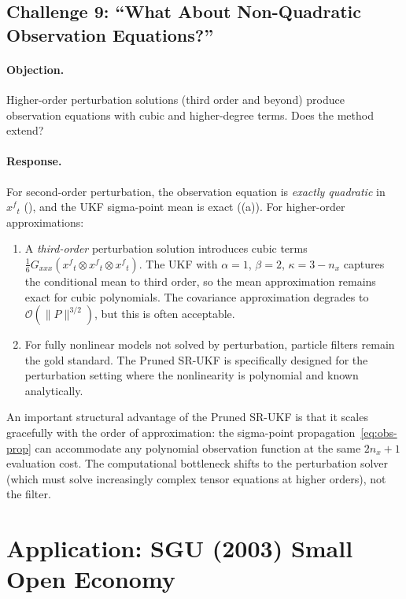 \documentclass[12pt,a4paper]{article}
\newcommand{\kron}{\otimes}
\newcommand{\xf}{{x^{f}}}
\newcommand{\cO}{\mathcal{O}}
\begin{document}
\subsection{Challenge 9: ``What About Non-Quadratic Observation Equations?''}
\label{sec:challenge-nonquad}

\paragraph{Objection.}
Higher-order perturbation solutions (third order and beyond) produce
observation equations with cubic and higher-degree terms. Does the
method extend?

\paragraph{Response.}
For second-order perturbation, the observation equation is
\emph{exactly quadratic} in~$\xf_t$ (), and the
UKF sigma-point mean is exact ((a)). For
higher-order approximations:
\begin{enumerate}[nosep]
\item A \emph{third-order} perturbation solution introduces cubic
terms $\tfrac{1}{6}G_{xxx}(\xf_t \kron \xf_t \kron \xf_t)$. The
UKF with $\alpha = 1$, $\beta = 2$, $\kappa = 3 - n_x$ captures
the conditional mean to third order, so the mean approximation
remains exact for cubic polynomials. The covariance approximation
degrades to $\cO(\|P\|^{3/2})$, but this is often acceptable.
\item For fully nonlinear models not solved by perturbation,
particle filters remain the gold standard. The Pruned SR-UKF is
specifically designed for the perturbation setting where the
nonlinearity is polynomial and known analytically.
\end{enumerate}

An important structural advantage of the Pruned SR-UKF is that it
scales gracefully with the order of approximation: the sigma-point
propagation~\eqref{eq:obs-prop} can accommodate any polynomial
observation function at the same $2n_x + 1$ evaluation cost. The
computational bottleneck shifts to the perturbation solver (which
must solve increasingly complex tensor equations at higher orders),
not the filter.


\section{Application: SGU (2003) Small Open Economy}\label{sec:application}
\end{document}
